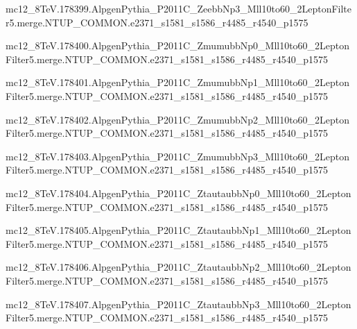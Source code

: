 mc12\_8TeV.178399.AlpgenPythia\_P2011C\_ZeebbNp3\_Mll10to60\_2LeptonFilter5.merge.NTUP\_COMMON.e2371\_s1581\_s1586\_r4485\_r4540\_p1575

mc12\_8TeV.178400.AlpgenPythia\_P2011C\_ZmumubbNp0\_Mll10to60\_2LeptonFilter5.merge.NTUP\_COMMON.e2371\_s1581\_s1586\_r4485\_r4540\_p1575

mc12\_8TeV.178401.AlpgenPythia\_P2011C\_ZmumubbNp1\_Mll10to60\_2LeptonFilter5.merge.NTUP\_COMMON.e2371\_s1581\_s1586\_r4485\_r4540\_p1575

mc12\_8TeV.178402.AlpgenPythia\_P2011C\_ZmumubbNp2\_Mll10to60\_2LeptonFilter5.merge.NTUP\_COMMON.e2371\_s1581\_s1586\_r4485\_r4540\_p1575

mc12\_8TeV.178403.AlpgenPythia\_P2011C\_ZmumubbNp3\_Mll10to60\_2LeptonFilter5.merge.NTUP\_COMMON.e2371\_s1581\_s1586\_r4485\_r4540\_p1575

mc12\_8TeV.178404.AlpgenPythia\_P2011C\_ZtautaubbNp0\_Mll10to60\_2LeptonFilter5.merge.NTUP\_COMMON.e2371\_s1581\_s1586\_r4485\_r4540\_p1575

mc12\_8TeV.178405.AlpgenPythia\_P2011C\_ZtautaubbNp1\_Mll10to60\_2LeptonFilter5.merge.NTUP\_COMMON.e2371\_s1581\_s1586\_r4485\_r4540\_p1575

mc12\_8TeV.178406.AlpgenPythia\_P2011C\_ZtautaubbNp2\_Mll10to60\_2LeptonFilter5.merge.NTUP\_COMMON.e2371\_s1581\_s1586\_r4485\_r4540\_p1575

mc12\_8TeV.178407.AlpgenPythia\_P2011C\_ZtautaubbNp3\_Mll10to60\_2LeptonFilter5.merge.NTUP\_COMMON.e2371\_s1581\_s1586\_r4485\_r4540\_p1575

\normalsize


